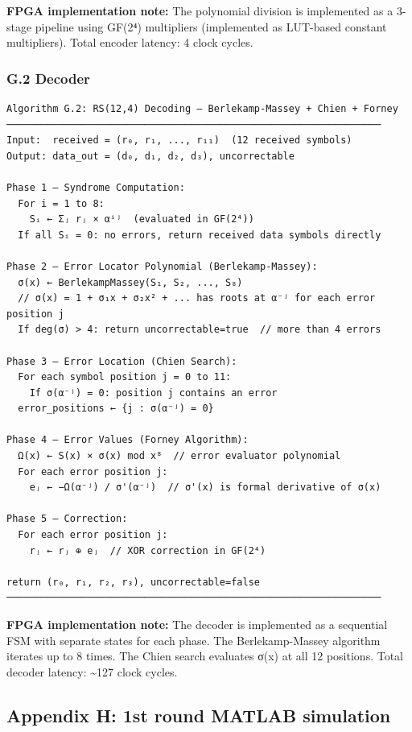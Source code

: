 \textbf{FPGA implementation note:} The polynomial division is
implemented as a 3-stage pipeline using GF(2⁴) multipliers (implemented
as LUT-based constant multipliers). Total encoder latency: 4 clock
cycles.

\subsubsection{G.2 Decoder}\label{g.2-decoder}

\begin{verbatim}
Algorithm G.2: RS(12,4) Decoding — Berlekamp-Massey + Chien + Forney
─────────────────────────────────────────────────────────────────
Input:  received = (r₀, r₁, ..., r₁₁)  (12 received symbols)
Output: data_out = (d₀, d₁, d₂, d₃), uncorrectable

Phase 1 — Syndrome Computation:
  For i = 1 to 8:
    Sᵢ ← Σⱼ rⱼ × αⁱʲ  (evaluated in GF(2⁴))
  If all Sᵢ = 0: no errors, return received data symbols directly

Phase 2 — Error Locator Polynomial (Berlekamp-Massey):
  σ(x) ← BerlekampMassey(S₁, S₂, ..., S₈)
  // σ(x) = 1 + σ₁x + σ₂x² + ... has roots at α⁻ʲ for each error position j
  If deg(σ) > 4: return uncorrectable=true  // more than 4 errors

Phase 3 — Error Location (Chien Search):
  For each symbol position j = 0 to 11:
    If σ(α⁻ʲ) = 0: position j contains an error
  error_positions ← {j : σ(α⁻ʲ) = 0}

Phase 4 — Error Values (Forney Algorithm):
  Ω(x) ← S(x) × σ(x) mod x⁸  // error evaluator polynomial
  For each error position j:
    eⱼ ← −Ω(α⁻ʲ) / σ'(α⁻ʲ)  // σ'(x) is formal derivative of σ(x)

Phase 5 — Correction:
  For each error position j:
    rⱼ ← rⱼ ⊕ eⱼ  // XOR correction in GF(2⁴)

return (r₀, r₁, r₂, r₃), uncorrectable=false
─────────────────────────────────────────────────────────────────
\end{verbatim}

\textbf{FPGA implementation note:} The decoder is implemented as a
sequential FSM with separate states for each phase. The Berlekamp-Massey
algorithm iterates up to 8 times. The Chien search evaluates σ(x) at all
12 positions. Total decoder latency: \textasciitilde127 clock cycles.

\subsection{Appendix H: 1st round MATLAB
simulation}\label{appendix-h-1st-round-matlab-simulation}


